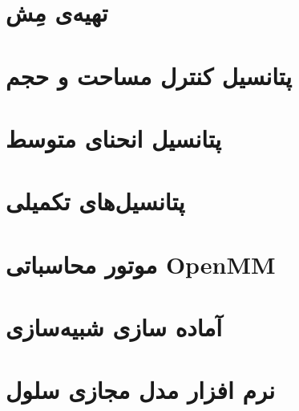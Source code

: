 \section{\label{sec:meshRecipe}
تهیه‌ی مِش
}


\section{\label{sec:areaVolumeD}
پتانسیل کنترل مساحت و حجم
}


\section{\label{sec:curvatureD}
پتانسیل انحنای متوسط
}



\section{
پتانسیل‌های تکمیلی
\label{sec:auxPotentials}
}




\section{\label{sec:OpenMM}
موتور محاسباتی
OpenMM
}


\section{\label{sec:dataAcu}
آماده سازی شبیه‌سازی
}


\section{\label{sec:VCM}
نرم افزار مدل مجازی سلول
}





